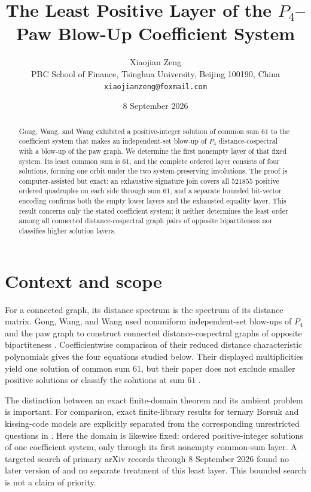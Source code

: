 \documentclass[11pt]{article}
\title{The Least Positive Layer of the $P_4$--Paw
Blow-Up Coefficient System}
\author{Xiaojian Zeng\\
\small PBC School of Finance, Tsinghua University, Beijing 100190, China\\
\small \texttt{xiaojianzeng@foxmail.com}}
\date{8 September 2026}
\newcommand{\Pfour}{P_4}
\begin{document}
\maketitle

\begin{abstract}
Gong, Wang, and Wang exhibited a positive-integer solution of common sum
$61$ to the coefficient system that makes an independent-set blow-up of
$P_4$ distance-cospectral with a blow-up of the paw graph.  We determine the
first nonempty layer of that fixed system.  Its least common sum is $61$, and
the complete ordered layer consists of four solutions, forming one orbit
under the two system-preserving involutions.  The proof is computer-assisted
but exact: an exhaustive signature join covers all $521855$ positive ordered
quadruples on each side through sum $61$, and a separate bounded bit-vector
encoding confirms both the empty lower layers and the exhausted equality
layer.  This result concerns only the stated coefficient system; it neither
determines the least order among all connected distance-cospectral graph
pairs of opposite bipartiteness nor classifies higher solution layers.
\end{abstract}

\section{Context and scope}

For a connected graph, its distance spectrum is the spectrum of its distance
matrix.  Gong, Wang, and Wang used nonuniform independent-set blow-ups of
$\Pfour$ and the paw graph to construct connected distance-cospectral graphs
of opposite bipartiteness \cite{GongWangWang2026}.  Coefficientwise comparison
of their reduced distance characteristic polynomials gives the four equations
studied below.  Their displayed multiplicities yield one solution of common
sum $61$, but their paper does not exclude smaller positive solutions or
classify the solutions at sum $61$ \cite[Eq.~(3.3), Thm.~3.1 and
Conclusion]{GongWangWang2026}.

The distinction between an exact finite-domain theorem and its ambient
problem is important.  For comparison, exact finite-library results for
ternary Borsuk and kissing-code models are explicitly separated from the
corresponding unrestricted questions in \cite{ZengEtAl2026FiniteCertificates}.
Here the domain is likewise fixed: ordered positive-integer solutions of one
coefficient system, only through its first nonempty common-sum layer.  A
targeted search of primary arXiv records through 8 September 2026 found no
later version of \cite{GongWangWang2026} and no separate treatment of this
least layer.  This bounded search is not a claim of priority.
\end{document}
